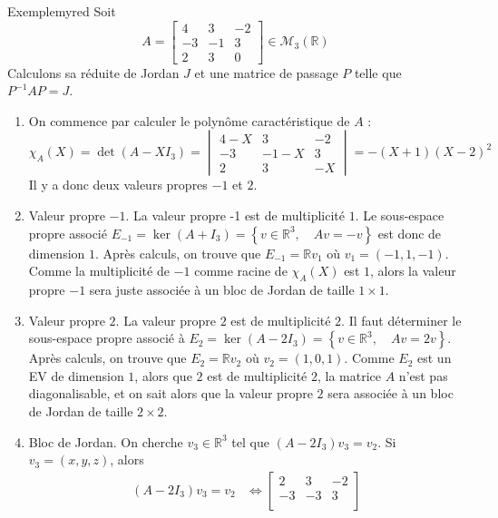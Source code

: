     \begin{omed}{Exemple}{myred}
        Soit 
        \[ A = \begin{bmatrix}
            4 & 3 & -2 \\
            -3 & -1 & 3 \\
            2 & 3 & 0 
        \end{bmatrix} \in \mathcal{M}_3(\mathbb{R}) \]   
        Calculons sa réduite de Jordan $J$ et une matrice de passage $P$ telle que $P^{-1} A P = J$.
        \begin{enumerate}
            \item On commence par calculer le polynôme caractéristique de $A$ : 
            \[ \chi_A(X) = \det(A - X I_3) = \begin{vmatrix}
                4 - X & 3 & -2 \\
                -3 & -1 -X & 3 \\
                2 & 3 & -X
            \end{vmatrix} = -(X + 1)(X - 2)^2 \]   
            Il y a donc deux valeurs propres $-1$ et $2$. 
            \item Valeur propre $-1$. \quad La valeur propre -1 est de multiplicité $1$. Le sous-espace propre associé $E_{-1} = \ker(A + I_3) = \left\{v \in \mathbb{R}^3, \quad A v = -v\right\}$ est donc de dimension $1$. Après calculs, on trouve que $E_{-1} = \mathbb{R} v_1$ où $v_1 = (-1, 1 ,-1)$. Comme la multiplicité de $-1$ comme racine de $\chi_{A}(X)$ est $1$, alors la valeur propre $-1$ sera juste associée à un bloc de Jordan de taille $1 \times 1$.
            \item Valeur propre $2$. \quad La valeur propre $2$ est de multiplicité $2$. Il faut déterminer le sous-espace propre associé à $E_2 = \ker(A - 2 I_3) = \left\{v \in \mathbb{R}^3, \quad A v = 2 v \right\}$. Après calculs, on trouve que $E_2 = \mathbb{R} v_2$ où $v_2 = (1,0,1)$. Comme $E_2$ est un EV de dimension $1$, alors que $2$ est de multiplicité $2$, la matrice $A$ n’est pas diagonalisable, et on sait alors que la valeur propre $2$ sera associée à un bloc de Jordan de taille $2 \times 2$. 
            \item Bloc de Jordan. \quad On cherche $v_3 \in \mathbb{R}^3$ tel que $(A - 2I_3) v_3 = v_2$. Si $v_3 = (x,y,z)$, alors 
            \begin{align*}
                (A - 2 I_3) v_3 = v_2 &\iff \begin{bmatrix}
                    2 & 3 & -2 \\
                    -3 & -3 & 3 \\

\end{bmatrix}
\end{align*}
\end{enumerate}
\end{omed}
